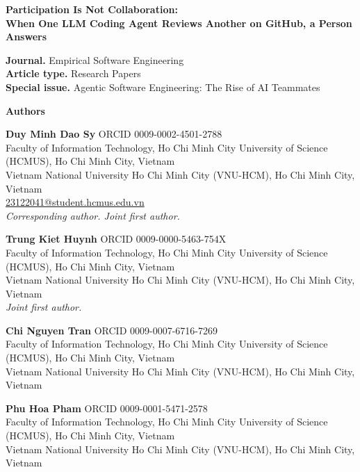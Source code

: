 \documentclass[11pt,a4paper]{article}
\begin{document}
\begin{center}
{\Large\bfseries Participation Is Not Collaboration:\\[2pt]
When One LLM Coding Agent Reviews Another on GitHub, a Person Answers\par}
\end{center}

\vspace{1em}

\textbf{Journal.} Empirical Software Engineering\\
\textbf{Article type.} Research Papers\\
\textbf{Special issue.} Agentic Software Engineering: The Rise of AI Teammates

\vspace{1.5em}

\textbf{\large Authors}

\textbf{Duy Minh Dao Sy} \quad ORCID 0009-0002-4501-2788\\
Faculty of Information Technology, Ho Chi Minh City University of Science
(HCMUS), Ho Chi Minh City, Vietnam\\
Vietnam National University Ho Chi Minh City (VNU-HCM), Ho Chi Minh City,
Vietnam\\
\href{mailto:23122041@student.hcmus.edu.vn}{23122041@student.hcmus.edu.vn}\\
\emph{Corresponding author. Joint first author.}

\textbf{Trung Kiet Huynh} \quad ORCID 0009-0000-5463-754X\\
Faculty of Information Technology, Ho Chi Minh City University of Science
(HCMUS), Ho Chi Minh City, Vietnam\\
Vietnam National University Ho Chi Minh City (VNU-HCM), Ho Chi Minh City,
Vietnam\\
\emph{Joint first author.}

\textbf{Chi Nguyen Tran} \quad ORCID 0009-0007-6716-7269\\
Faculty of Information Technology, Ho Chi Minh City University of Science
(HCMUS), Ho Chi Minh City, Vietnam\\
Vietnam National University Ho Chi Minh City (VNU-HCM), Ho Chi Minh City,
Vietnam

\textbf{Phu Hoa Pham} \quad ORCID 0009-0001-5471-2578\\
Faculty of Information Technology, Ho Chi Minh City University of Science
(HCMUS), Ho Chi Minh City, Vietnam\\
Vietnam National University Ho Chi Minh City (VNU-HCM), Ho Chi Minh City,
Vietnam
\end{document}
